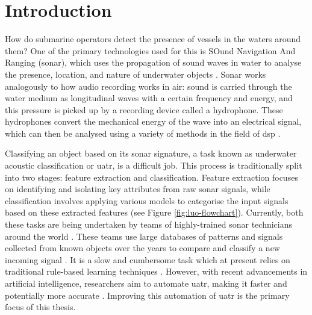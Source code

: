 \chapter{Introduction}


How do submarine operators detect the presence of vessels in the waters around them? One of the primary technologies used for this is SOund Navigation And Ranging (sonar), which uses the propagation of sound waves in water to analyse the presence, location, and nature of underwater objects \cite{niu_advances_2023}. Sonar works analogously to how audio recording works in air: sound is carried through the water medium as longitudinal waves with a certain frequency and energy, and this pressure is picked up by a recording device called a hydrophone. These hydrophones convert the mechanical energy of the wave into an electrical signal, which can then be analysed using a variety of methods in the field of \acrfull{dsp} \cite{waite_sonar_2002, domingos_survey_2022}.

Classifying an object based on its sonar signature, a task known as underwater acoustic classification or \acrfull{uatr}, is a difficult job. This process is traditionally split into two stages: feature extraction and classification. Feature extraction focuses on identifying and isolating key attributes from raw sonar signals, while classification involves applying various models to categorise the input signals based on these extracted features (see Figure \ref{fig:luo-flowchart}). Currently, both these tasks are being undertaken by teams of highly-trained sonar technicians around the world \cite{aslam_underwater_2024}. These teams use large databases of patterns and signals collected from known objects over the years to compare and classify a new incoming signal \cite{niu_advances_2023}. It is a slow and cumbersome task which at present relies on traditional rule-based learning techniques \cite{neupane_review_2020}.  However, with recent advancements in artificial intelligence, researchers aim to automate \acrshort{uatr}, making it faster and potentially more accurate \cite{aslam_underwater_2024, neupane_review_2020}. Improving this automation of \acrshort{uatr} is the primary focus of this thesis.

